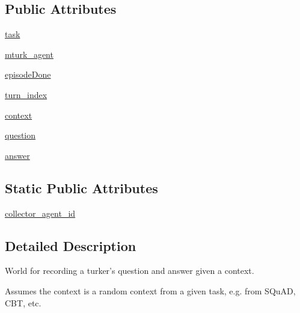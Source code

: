 \subsection*{Public Attributes}
\begin{DoxyCompactItemize}
\item 
\hyperlink{classparlai_1_1mturk_1_1tasks_1_1qa__data__collection_1_1worlds_1_1QADataCollectionWorld_af4920389fe999b17b4ee02cda2cf9bb3}{task}
\item 
\hyperlink{classparlai_1_1mturk_1_1tasks_1_1qa__data__collection_1_1worlds_1_1QADataCollectionWorld_ac14b453b60411faa4311575b04311125}{mturk\+\_\+agent}
\item 
\hyperlink{classparlai_1_1mturk_1_1tasks_1_1qa__data__collection_1_1worlds_1_1QADataCollectionWorld_a6db67da628706c8ecfbacffdbcef307f}{episode\+Done}
\item 
\hyperlink{classparlai_1_1mturk_1_1tasks_1_1qa__data__collection_1_1worlds_1_1QADataCollectionWorld_abff243d566705bf676a2f0a4f0fce0aa}{turn\+\_\+index}
\item 
\hyperlink{classparlai_1_1mturk_1_1tasks_1_1qa__data__collection_1_1worlds_1_1QADataCollectionWorld_aa0dd855f777784dfc16a7dfbf0fe685f}{context}
\item 
\hyperlink{classparlai_1_1mturk_1_1tasks_1_1qa__data__collection_1_1worlds_1_1QADataCollectionWorld_aa775e00aa377673da216b722b81817be}{question}
\item 
\hyperlink{classparlai_1_1mturk_1_1tasks_1_1qa__data__collection_1_1worlds_1_1QADataCollectionWorld_ac49d32ed1e55930adf70fb5c60adc7e0}{answer}
\end{DoxyCompactItemize}
\subsection*{Static Public Attributes}
\begin{DoxyCompactItemize}
\item 
\hyperlink{classparlai_1_1mturk_1_1tasks_1_1qa__data__collection_1_1worlds_1_1QADataCollectionWorld_ab40362313ba2494ae2246526589dbaa6}{collector\+\_\+agent\+\_\+id}
\end{DoxyCompactItemize}


\subsection{Detailed Description}
\begin{DoxyVerb}World for recording a turker's question and answer given a context.

Assumes the context is a random context from a given task, e.g. from SQuAD, CBT,
etc.
\end{DoxyVerb}
 

